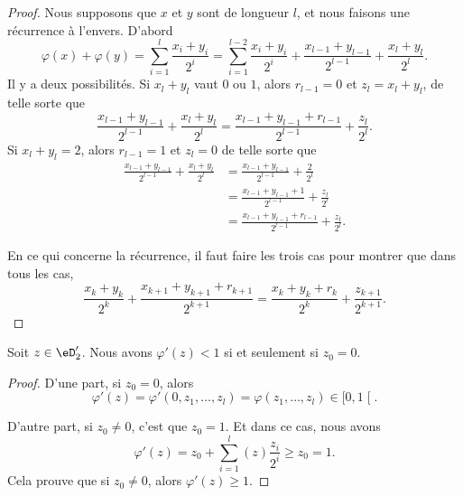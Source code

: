 \begin{proof}
	Nous supposons que \( x\) et \( y\) sont de longueur \( l\), et nous faisons une récurrence à l'envers. D'abord
	\begin{equation}
		\varphi(x)+\varphi(y)=\sum_{i=1}^l\frac{ x_i+y_i }{ 2^i }=\sum_{i=1}^{l-2}\frac{ x_i+y_i }{ 2^i }+\frac{ x_{l-1}+y_{l-1} }{ 2^{l-1} }+\frac{ x_l+y_l }{ 2^l }.
	\end{equation}
	Il y a deux possibilités. Si \( x_l+y_l\) vaut \( 0\) ou \( 1\), alors \( r_{l-1}=0\) et \( z_l=x_l+y_l\), de telle sorte que
	\begin{equation}
		\frac{ x_{l-1}+y_{l-1} }{ 2^{l-1} }+\frac{ x_l+y_l }{ 2^l }=\frac{ x_{l-1}+y_{l-1}+r_{l-1} }{ 2^{l-1} }+\frac{ z_l }{ 2^l }.
	\end{equation}
	Si \( x_l+y_l=2\), alors \( r_{l-1}=1\) et \( z_l=0\) de telle sorte que
	\begin{subequations}
		\begin{align}
			\frac{ x_{l-1}+y_{l-1} }{ 2^{l-1} }+\frac{ x_l+y_l }{ 2^l } & =\frac{ x_{l-1}+y_{l-1} }{ 2^{l-1} }+\frac{ 2 }{ 2^l }            \\
			                                                            & =\frac{ x_{l-1}+y_{l-1}+1 }{ 2^{l-1} }+\frac{ z_l }{ 2^l }        \\
			                                                            & =\frac{ x_{l-1}+y_{l-1}+r_{l-1} }{ 2^{l-1} }+\frac{ z_l }{ 2^l }.
		\end{align}
	\end{subequations}

	En ce qui concerne la récurrence, il faut faire les trois cas pour montrer que dans tous les cas,
	\begin{equation}
		\frac{ x_k+y_k }{ 2^k }+\frac{ x_{k+1}+y_{k+1}+r_{k+1} }{ 2^{k+1} }=\frac{ x_k+y_k+r_k }{ 2^k }+\frac{ z_{k+1} }{ 2^{k+1} }.
	\end{equation}
\end{proof}


\begin{lemma}	\label{LEMooEAIBooMxCDHF}
	Soit \( z\in \eD'_2\). Nous avons \( \varphi'(z)<1\) si et seulement si \( z_0=0\).
\end{lemma}

\begin{proof}
	D'une part,	si \( z_0=0\), alors
	\begin{equation}
		\varphi'(z)=\varphi'(0,z_1,\ldots,z_l)=\varphi(z_1,\ldots,z_l)\in\mathopen[ 0,1\mathclose[.
	\end{equation}

	D'autre part, si \( z_0\neq 0\), c'est que \( z_0=1\). Et dans ce cas, nous avons
	\begin{equation}
		\varphi'(z)=z_0+\sum_{i=1}^l(z)\frac{ z_i }{ 2^i }\geq z_0=1.
	\end{equation}
	Cela prouve que si \( z_0\neq 0\), alors \( \varphi'(z)\geq 1\).
\end{proof}

